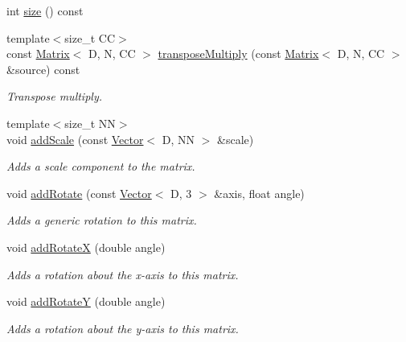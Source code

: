 \begin{Indent}
\begin{DoxyCompactItemize}
int \mbox{\hyperlink{classrev_1_1_square_matrix_a866732338cc9fb3d1d0d786f10baf41e}{size}} () const
\item 
{\footnotesize template$<$size\+\_\+t CC$>$ }\\const \mbox{\hyperlink{classrev_1_1_matrix}{Matrix}}$<$ D, N, CC $>$ \mbox{\hyperlink{classrev_1_1_square_matrix_a160ef125ea1c6e5f33078980b6e411d8}{transpose\+Multiply}} (const \mbox{\hyperlink{classrev_1_1_matrix}{Matrix}}$<$ D, N, CC $>$ \&source) const
\begin{DoxyCompactList}\small\item\em Transpose multiply. \end{DoxyCompactList}\item 
\mbox{\label{classrev_1_1_square_matrix_ae235e9311a1bf49da4464284ed595be9}} 
{\footnotesize template$<$size\+\_\+t NN$>$ }\\void \mbox{\hyperlink{classrev_1_1_square_matrix_ae235e9311a1bf49da4464284ed595be9}{add\+Scale}} (const \mbox{\hyperlink{classrev_1_1_vector}{Vector}}$<$ D, NN $>$ \&scale)
\begin{DoxyCompactList}\small\item\em Adds a scale component to the matrix. \end{DoxyCompactList}\item 
void \mbox{\hyperlink{classrev_1_1_square_matrix_aa32e581d2541d5b6de2d18819a3d71e2}{add\+Rotate}} (const \mbox{\hyperlink{classrev_1_1_vector}{Vector}}$<$ D, 3 $>$ \&axis, float angle)
\begin{DoxyCompactList}\small\item\em Adds a generic rotation to this matrix. \end{DoxyCompactList}\item 
void \mbox{\hyperlink{classrev_1_1_square_matrix_ab075a9f62334836786c4c7fd564cb111}{add\+RotateX}} (double angle)
\begin{DoxyCompactList}\small\item\em Adds a rotation about the x-\/axis to this matrix. \end{DoxyCompactList}\item 
void \mbox{\hyperlink{classrev_1_1_square_matrix_a9a9cacfafa0279bbaec44b5ee50540ea}{add\+RotateY}} (double angle)
\begin{DoxyCompactList}\small\item\em Adds a rotation about the y-\/axis to this matrix. \end{DoxyCompactList}\item 

\end{DoxyCompactItemize}
\end{Indent}
